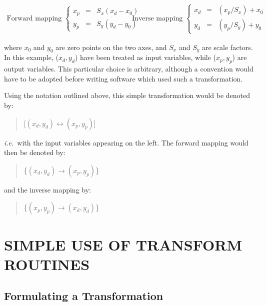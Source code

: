 \begin{equation}
\begin{array}{cc}
\mbox{Forward mapping } \left\{
\begin{array}{lll}
x_p & = & S_x(x_d-x_0) \\
y_p & = & S_y(y_d-y_0)
\end{array} \right.
&
\mbox{Inverse mapping } \left\{
\begin{array}{lll}
x_d & = & (x_p/S_x)+x_0 \\
y_d & = & (y_p/S_y)+y_0
\end{array} \right.
\end{array}
\end{equation}

where \mbox{$x_0$} and \mbox{$y_0$} are zero points on the two axes, and
\mbox{$S_x$} and \mbox{$S_y$} are scale factors. 
In this example, \mbox{($x_d,y_d$)} have been treated as input variables,
while \mbox{($x_p,y_p$)} are output variables. 
This particular choice is arbitrary, although a convention would have to be
adopted before writing software which used such a transformation. 

Using the notation outlined above, this simple transformation would be
denoted by:
\begin{quote}
\begin{center}
\mbox{[$(x_d,y_d) \leftrightarrow (x_p,y_p)$]}
\end{center}
\end{quote}
{\em i.e.}\ with the input variables appearing on the left. 
The forward mapping would then be denoted by:
\begin{quote}
\begin{center}
\mbox{\{$(x_d,y_d) \rightarrow (x_p,y_p)$\}}
\end{center}
\end{quote}
and the inverse mapping by:
\begin{quote}
\begin{center}
\mbox{\{$(x_p,y_p) \rightarrow (x_d,y_d)$\}}
\end{center}
\end{quote}
\exampledone


\section{SIMPLE USE OF TRANSFORM ROUTINES}


\subsection{Formulating a Transformation}

